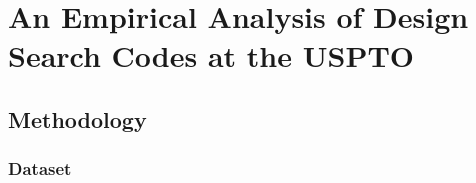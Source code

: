 \documentclass[letterpaper, 11pt, oneside]{article}
\begin{document}

\section{An Empirical Analysis of Design Search Codes at the USPTO}\label{sec:2}

\subsection{Methodology}\label{subsec:2A}

\subsubsection{Dataset}\label{subsubsec:2A1}
\end{document}
